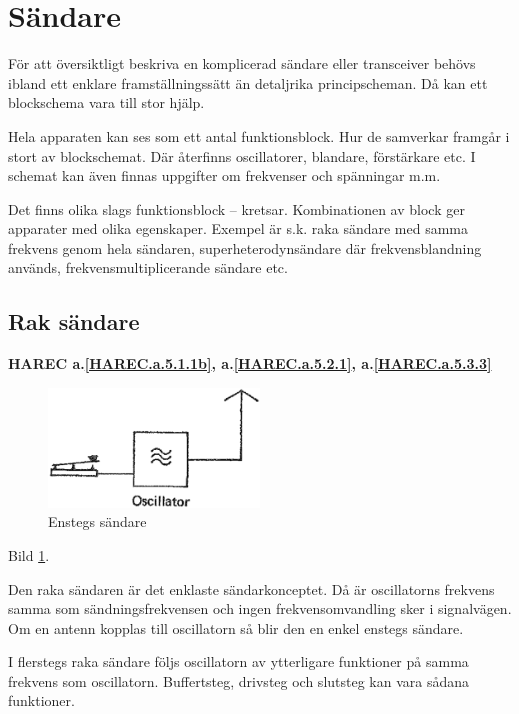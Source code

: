 \section{Sändare}
\label{sändare}

För att översiktligt beskriva en komplicerad sändare eller transceiver
behövs ibland ett enklare framställningssätt än detaljrika
principscheman. Då kan ett blockschema vara till stor hjälp.

Hela apparaten kan ses som ett antal funktionsblock. Hur de samverkar
framgår i stort av blockschemat. Där återfinns oscillatorer, blandare,
förstärkare etc. I schemat kan även finnas uppgifter om frekvenser och
spänningar m.m.

Det finns olika slags funktionsblock -- kretsar. Kombinationen av block
ger apparater med olika egenskaper. Exempel är s.k. raka sändare med
samma frekvens genom hela sändaren, superheterodynsändare där
frekvensblandning används, frekvensmultiplicerande sändare etc.

\subsection{Rak sändare}
\textbf{HAREC
  a.\ref{HAREC.a.5.1.1b}\label{myHAREC.a.5.1.1b},
  a.\ref{HAREC.a.5.2.1}\label{myHAREC.a.5.2.1},
  a.\ref{HAREC.a.5.3.3}\label{myHAREC.a.5.3.3}
}

\begin{figure}
  \includegraphics[width=0.5\textwidth]{images/cropped_pdfs/bild_2_5-01.pdf}
  \caption{Enstegs sändare}
  \label{fig:bildII5-1}
\end{figure}

Bild \ref{fig:bildII5-1}.

Den raka sändaren är det enklaste sändarkonceptet. Då är oscillatorns
frekvens samma som sändningsfrekvensen och ingen frekvensomvandling
sker i signalvägen. Om en antenn kopplas till oscillatorn så blir den
en enkel enstegs sändare.

I flerstegs raka sändare följs oscillatorn av ytterligare funktioner
på samma frekvens som oscillatorn. Buffertsteg, drivsteg och slutsteg
kan vara sådana funktioner.


